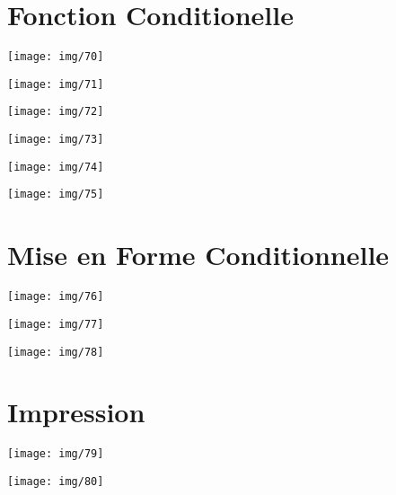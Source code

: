 \documentclass[a4paper, 12pt, twoside,openright]{report}
\begin{document}
\part{Fonction Conditionelle}
\begin{landscape} 		
	\texttt{[image: img/70]}
\end{landscape}
\begin{landscape} 		
	\texttt{[image: img/71]}
\end{landscape}
\begin{landscape} 		
	\texttt{[image: img/72]}
\end{landscape}
\begin{landscape} 		
	\texttt{[image: img/73]}
\end{landscape}
\begin{landscape} 		
	\texttt{[image: img/74]}
\end{landscape}
\begin{landscape} 		
	\texttt{[image: img/75]}
\end{landscape}

\part{Mise en Forme Conditionnelle}
\begin{landscape} 		
	\texttt{[image: img/76]}
\end{landscape}
\begin{landscape} 		
	\texttt{[image: img/77]}
\end{landscape}
\begin{landscape} 		
	\texttt{[image: img/78]}
\end{landscape}

\part{Impression}
\begin{landscape} 		
	\texttt{[image: img/79]}
\end{landscape}
\begin{landscape} 		
	\texttt{[image: img/80]}
\end{landscape}
\end{document}
